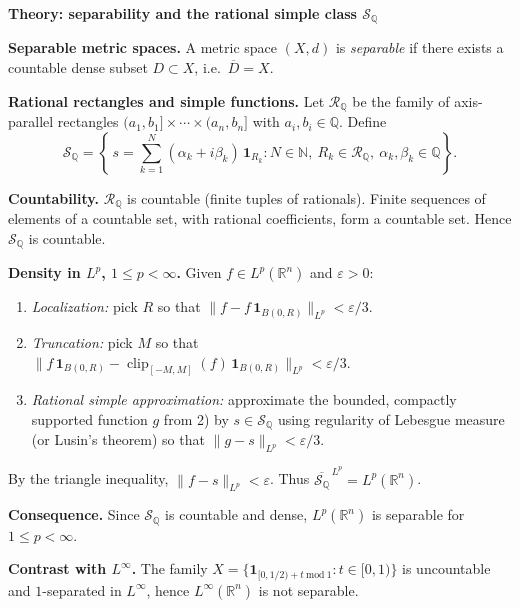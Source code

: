 \begin{problem}[CP-III-0010]
\par\medskip\noindent\textbf{Theory: separability and the rational simple class $\mathcal S_{\mathbb Q}$}\quad


	\textbf{Separable metric spaces.}
	A metric space $(X,d)$ is \emph{separable} if there exists a countable dense subset $D\subset X$,
	i.e.\ $\overline D=X$.

	\textbf{Rational rectangles and simple functions.}
	Let $\mathcal R_{\mathbb Q}$ be the family of axis-parallel rectangles
	$(a_1,b_1]\times\cdots\times(a_n,b_n]$ with $a_i,b_i\in\mathbb Q$.
	Define
	\[
	\mathcal S_{\mathbb Q}
	= \left\{\, s=\sum_{k=1}^N (\alpha_k+i\beta_k)\,\mathbf 1_{R_k}
	: N\in\mathbb N,\ R_k\in\mathcal R_{\mathbb Q},\ \alpha_k,\beta_k\in\mathbb Q \right\}.
	\]

	\textbf{Countability.}
	$\mathcal R_{\mathbb Q}$ is countable (finite tuples of rationals).
	Finite sequences of elements of a countable set, with rational coefficients, form a countable set.
	Hence $\mathcal S_{\mathbb Q}$ is countable.

	\textbf{Density in $L^p$, $1\le p<\infty$.}
	Given $f\in L^p(\mathbb R^n)$ and $\varepsilon>0$:
	\begin{enumerate}[label=\arabic*)]
		\item \emph{Localization:} pick $R$ so that $\|f-f\,\mathbf 1_{B(0,R)}\|_{L^p}<\varepsilon/3$.
		\item \emph{Truncation:} pick $M$ so that
		$\|f\,\mathbf 1_{B(0,R)}-\operatorname{clip}_{[-M,M]}(f)\,\mathbf 1_{B(0,R)}\|_{L^p}<\varepsilon/3$.
		\item \emph{Rational simple approximation:}
		approximate the bounded, compactly supported function $g$ from 2) by
		$s\in\mathcal S_{\mathbb Q}$ using regularity of Lebesgue measure (or Lusin’s theorem) so that
		$\|g-s\|_{L^p}<\varepsilon/3$.
	\end{enumerate}
	By the triangle inequality, $\|f-s\|_{L^p}<\varepsilon$.
	Thus $\overline{\mathcal S_{\mathbb Q}}^{\,L^p}=L^p(\mathbb R^n)$.

	\textbf{Consequence.}
	Since $\mathcal S_{\mathbb Q}$ is countable and dense, $L^p(\mathbb R^n)$ is separable for $1\le p<\infty$.

	\textbf{Contrast with $L^\infty$.}
	The family $X=\{\mathbf 1_{[0,1/2)+t \ \mathrm{mod}\ 1}: t\in[0,1)\}$ is uncountable and
	$1$-separated in $L^\infty$, hence $L^\infty(\mathbb R^n)$ is not separable.



\end{problem}
